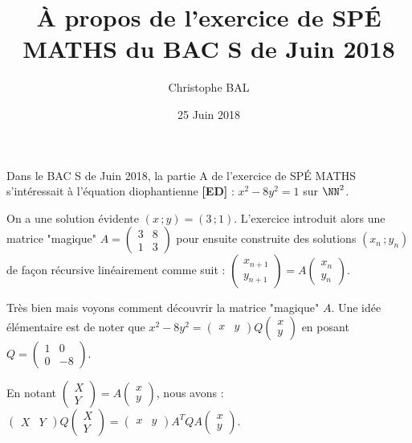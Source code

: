 \documentclass[12pt]{amsart}
\begin{document}
\title{À propos de l'exercice de SPÉ MATHS du BAC S de Juin 2018}
\author{Christophe BAL}
\date{25 Juin 2018}
\maketitle

Dans le BAC S de Juin 2018, la partie A de l'exercice de SPÉ MATHS s'intéressait à l'équation diophantienne \textbf{[ED]} : $x^2 - 8 y^2 = 1$ sur $\NN^2$. 


\medskip

On a une solution évidente $(x \,; y) = (3 \,; 1)$. L'exercice introduit alors une matrice "magique"
$A =
\begin{pmatrix} 
  3 & 8  \\ 
  1 & 3 
\end{pmatrix}$
pour ensuite construite des solutions $(x_n \,; y_n)$ de façon récursive linéairement comme suit :
$\begin{pmatrix} 
  x_{n+1} \\ 
  y_{n+1} 
\end{pmatrix}
=
A
\begin{pmatrix} 
  x_{n} \\ 
  y_{n} 
\end{pmatrix}
$.


\medskip

Très bien mais voyons comment découvrir la matrice "magique" $A$. Une idée élémentaire est de noter que
$x^2 - 8 y^2
=
\begin{pmatrix} 
  x & y 
\end{pmatrix}
Q
\begin{pmatrix} 
  x \\ 
  y 
\end{pmatrix}$
en posant
$Q
=
\begin{pmatrix} 
  1 & 0  \\ 
  0 & -8 
\end{pmatrix}$.


\medskip

En notant 
$\begin{pmatrix} 
  X \\ 
  Y 
\end{pmatrix}
=
A
\begin{pmatrix} 
  x \\ 
  y 
\end{pmatrix}$,
nous avons :
$\begin{pmatrix} 
  X & Y 
\end{pmatrix}
Q
\begin{pmatrix} 
  X \\ 
  Y 
\end{pmatrix}
=
\begin{pmatrix} 
  x & y 
\end{pmatrix}
A^T Q A
\begin{pmatrix} 
  x \\ 
  y 
\end{pmatrix}$.
\end{document}
